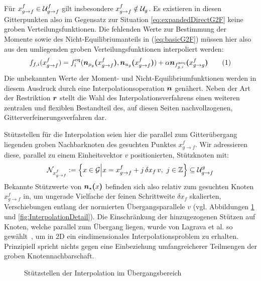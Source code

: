 Für \(x_{g \to f}^f \in \mathcal{U}_{g \to f}^f\) gilt insbesondere \(x_{g \to f}^f \notin \mathcal{U}_g\). Es existieren in diesen Gitterpunkten also im Gegensatz zur Situation \ref{eq:expandedDirectG2F} keine groben Verteilungsfunktionen. Die fehlenden Werte zur Bestimmung der Momente sowie des Nicht-Equilibriumanteils in (\ref{eq:basicG2F}) müssen hier also aus den umliegenden groben Verteilungsfunktionen interpoliert werden:
\[f_{f,i}(x_{g \to f}^f) = f_i^\text{eq}(\ipolarg{\rho_g}{x_{g \to f}^f}, \ipolarg{u_g}{x_{g \to f}^f}) + \alpha \ipolarg{f_{g,i}^\text{neq}}{x_{g \to g}^f} \numberthis\label{eq:expandedInterpolG2F}\]
Die unbekannten Werte der Moment- und Nicht-Equilibriumfunktionen werden in diesem Ausdruck durch eine Interpolationsoperation \(\operatorname{\boldsymbol{n}}\) genähert. Neben der Art der Restriktion \(\operatorname{\boldsymbol{r}}\) stellt die Wahl des Interpolationsverfahrens einen weiteren zentralen und flexiblen Bestandteil des, auf diesen Seiten nachvollzogenen, Gitterverfeinerungsverfahren dar.

\bigskip

Stützstellen für die Interpolation seien hier die parallel zum Gitterübergang liegenden groben Nachbarknoten des gesuchten Punktes \(x_{g \to f}^f\). Wir adressieren diese, parallel zu einem Einheitsvektor \(v\) positionierten, Stützknoten mit:
\[\mathcal{N}_{x_{g \to f}^f} := \left\{x \in \mathcal{G} \middle| x = x_{g \to f}^f + j \, \delta x_f \, v,\ j \in \mathbb{Z} \right\} \subseteq \mathcal{U}_{g \to f}^g\]
Bekannte Stützwerte von \(\boldsymbol{n}_{\star}\boldsymbol{(}{x}\boldsymbol{)}\) befinden sich also relativ zum gesuchten Knoten \(x_{g \to f}^f\) in, um ungerade Vielfache der feinen Schrittweite \(\delta x_f\) skalierten, Verschiebungen entlang der normierten Übergangsparallele \(v\) (vgl. Abbildungen \ref{fig:InterpolationBasis} und \ref{fig:InterpolationDetail}). Die Einschränkung der hinzugezogenen Stützen auf Knoten, welche parallel zum Übergang liegen, wurde von Lagrava et al. so gewählt~\cite[Kap.~3.6]{lagrava12}, um in 2D ein eindimensionales Interpolationsproblem zu erhalten. Prinzipiell spricht nichts gegen eine Einbeziehung umfangreicherer Teilmengen der groben Knotennachbarschaft.

\begin{figure}[h]
\centering

\caption{Stützstellen der Interpolation im Übergangsbereich}
\label{fig:InterpolationBasis}
\end{figure}

